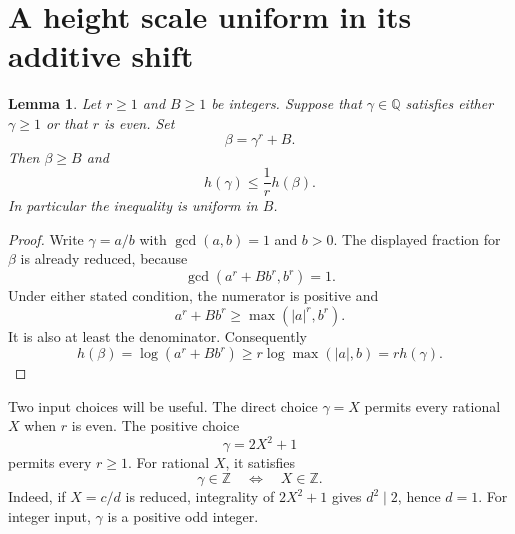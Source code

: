 \documentclass[11pt,a4paper]{article}
\newtheorem{lemma}[theorem]{Lemma}
\theoremstyle{remark}\newtheorem{remark}[theorem]{Remark}
\newcommand{\Q}{\mathbb Q}\newcommand{\Z}{\mathbb Z}
\begin{document}
\section{A height scale uniform in its additive shift}

\begin{lemma}\label{lem:power}
Let $r\ge1$ and $B\ge1$ be integers. Suppose that
$\gamma\in\Q$ satisfies either $\gamma\ge1$ or that $r$ is even.
Set
\[
                         \beta=\gamma^r+B.
\]
Then $\beta\ge B$ and
\begin{equation}\label{eq:powerheight}
                         h(\gamma)\le\frac1r h(\beta).
\end{equation}
In particular the inequality is uniform in $B$.
\end{lemma}
\begin{proof}
Write $\gamma=a/b$ with $\gcd(a,b)=1$ and $b>0$.
The displayed fraction for $\beta$ is already reduced, because
\[
                  \gcd(a^r+Bb^r,b^r)=1.
\]
Under either stated condition, the numerator is positive and
\[
                   a^r+Bb^r\ge\max(|a|^r,b^r).
\]
It is also at least the denominator. Consequently
\[
 h(\beta)=\log(a^r+Bb^r)
                \ge r\log\max(|a|,b)=r h(\gamma).
\]
\end{proof}

Two input choices will be useful. The direct choice
$\gamma=X$ permits every rational $X$ when $r$ is even.
The positive choice
\begin{equation}\label{eq:positiveinput}
                         \gamma=2X^2+1
\end{equation}
permits every $r\ge1$. For rational $X$, it satisfies
\begin{equation}\label{eq:integrality}
                      \gamma\in\Z\quad\Longleftrightarrow\quad X\in\Z.
\end{equation}
Indeed, if $X=c/d$ is reduced, integrality of $2X^2+1$ gives
$d^2\mid2$, hence $d=1$. For integer input, $\gamma$ is a
positive odd integer.
\end{document}
